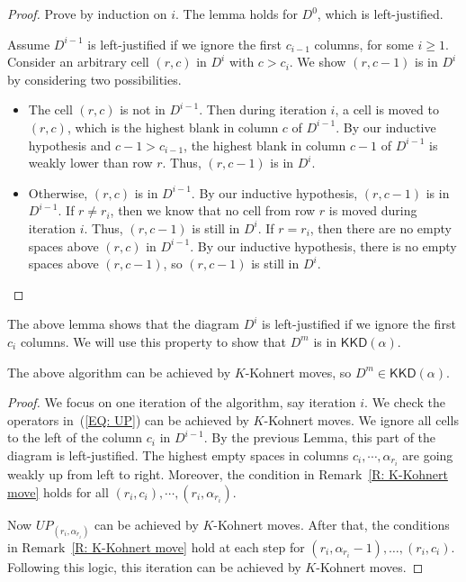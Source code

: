\documentclass[ALCO]{cedram}
\newcommand{\KKD}{\mathsf{KKD}}
\begin{document}
\begin{proof}
Prove by induction on $i$.
The lemma holds for $D^0$, which is left-justified.

Assume $D^{i-1}$ is left-justified if we ignore the first $c_{i-1}$ columns,
for some $i \geq 1$.
Consider an arbitrary cell $(r,c)$ in $D^i$
with $c > c_i$.
We show $(r, c-1)$ is in $D^i$ by considering two possibilities.
\begin{itemize}
\item[-] The cell $(r,c)$ is not in $D^{i-1}$.
Then during iteration $i$, a cell is moved to $(r,c)$,
which is the highest blank in column $c$ of $D^{i-1}$.
By our inductive hypothesis and $c-1 > c_{i-1}$, 
the highest blank in column $c-1$ of $D^{i-1}$
is weakly lower than row $r$.
Thus, $(r,c-1)$ is in $D^i$.
\item[-] Otherwise, $(r,c)$ is in $D^{i-1}$.
By our inductive hypothesis, 
$(r, c-1)$ is in $D^{i-1}$.
If $r \neq r_i$,
then we know that no cell from row $r$ is moved 
during iteration $i$.
Thus, $(r,c-1)$ is still in $D^i$.
If $r = r_i$,
then there are no empty spaces above $(r,c)$
in $D^{i-1}$.
By our inductive hypothesis, 
there is no empty spaces above $(r,c-1)$,
so $(r,c-1)$ is still in $D^i$. \qedhere
\end{itemize}
\end{proof}

The above lemma shows that the diagram $D^i$ is left-justified if we ignore the first $c_i$ columns.
We will use this property to show that $D^m$ 
is in $\KKD(\alpha)$.
\begin{prop}\label{P: Top Las 1}
The above algorithm can be achieved by $K$-Kohnert moves,
so $D^m \in \KKD(\alpha)$.
\end{prop}

\begin{proof}
We focus on one iteration of the algorithm,
say iteration $i$.
We check the operators 
in~(\ref{EQ: UP}) can be achieved by $K$-Kohnert moves. 
We ignore all cells to the left of the column $c_i$ in $D^{i-1}$.
By the previous Lemma, this part of the diagram 
is left-justified.
The highest empty spaces in columns $c_i, \cdots, \alpha_{r_i}$
are going weakly up from left to right.
Moreover, the condition in Remark~\ref{R: K-Kohnert move} 
holds for all $(r_i, c_i), \cdots, (r_i, \alpha_{r_i})$.

Now $UP_{(r_i, \alpha_{r_i})}$
can be achieved by $K$-Kohnert moves.
After that, the conditions in Remark~\ref{R: K-Kohnert move} 
hold at each step for $(r_i, \alpha_{r_i} - 1), \dots, (r_i, c_i)$.
Following this logic, this iteration can be achieved by $K$-Kohnert moves. 
\end{proof}
\end{document}
